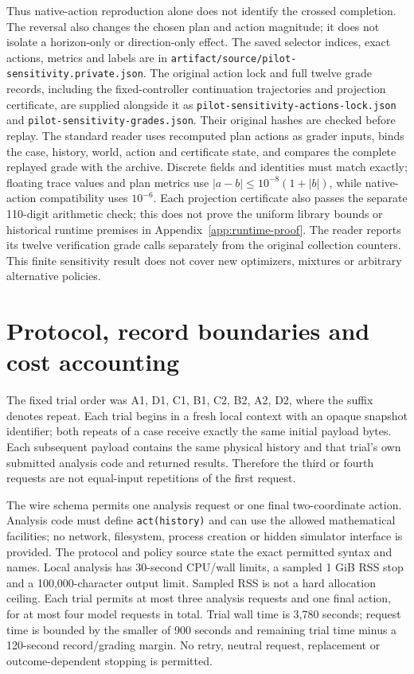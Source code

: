 Thus native-action reproduction alone does not identify the crossed
completion. The reversal also changes the chosen plan and action magnitude;
it does not isolate a horizon-only or direction-only effect. The saved
selector indices, exact actions, metrics and labels are in
\texttt{artifact/source/pilot-sensitivity.private.json}. The original
action lock and full twelve grade records, including the fixed-controller
continuation trajectories and projection certificate, are supplied alongside
it as \texttt{pilot-sensitivity-actions-lock.json} and
\texttt{pilot-sensitivity-grades.json}. Their original hashes are checked
before replay. The standard reader uses recomputed plan actions as grader
inputs, binds the case, history, world, action and certificate state, and
compares the complete replayed grade with the archive. Discrete fields and
identities must match exactly; floating trace values and plan metrics use
$|a-b|\leq10^{-8}(1+|b|)$, while native-action compatibility uses $10^{-6}$.
Each projection certificate also passes the separate 110-digit arithmetic
check; this does not prove the uniform library bounds or historical runtime
premises in Appendix~\ref{app:runtime-proof}. The reader reports its twelve
verification grade calls separately from the original collection counters.
This finite
sensitivity result does not cover new optimizers, mixtures or arbitrary
alternative policies.

\section{Protocol, record boundaries and cost accounting}
\label{app:protocol}
The fixed trial order was A1, D1, C1, B1, C2, B2, A2, D2, where the suffix denotes repeat. Each trial begins in a fresh local context with an opaque snapshot identifier; both repeats of a case receive exactly the same initial payload bytes. Each subsequent payload contains the same physical history and that trial's own submitted analysis code and returned results. Therefore the third or fourth requests are not equal-input repetitions of the first request.

The wire schema permits one analysis request or one final two-coordinate action. Analysis code must define \texttt{act(history)} and can use the allowed mathematical facilities; no network, filesystem, process creation or hidden simulator interface is provided. The protocol and policy source state the exact permitted syntax and names. Local analysis has 30-second CPU/wall limits, a sampled 1 GiB RSS stop and a 100,000-character output limit. Sampled RSS is not a hard allocation ceiling. Each trial permits at most three analysis requests and one final action, for at most four model requests in total. Trial wall time is 3,780 seconds; request time is bounded by the smaller of 900 seconds and remaining trial time minus a 120-second record/grading margin. No retry, neutral request, replacement or outcome-dependent stopping is permitted.

